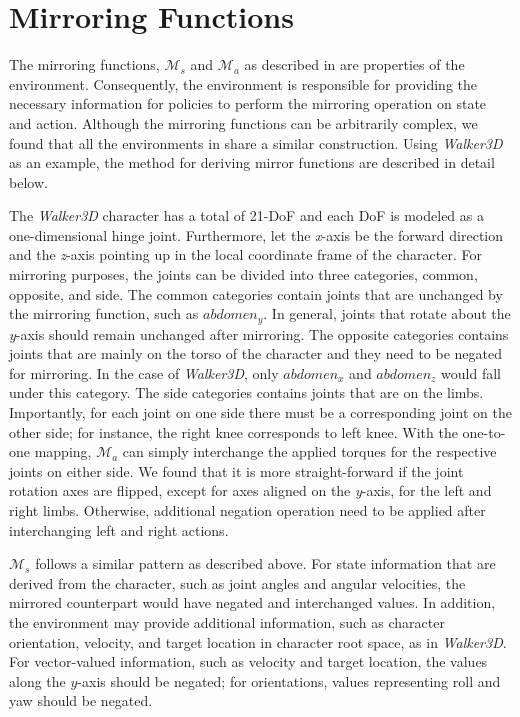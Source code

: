 \section{Mirroring Functions}
\label{sec:mirroring-functions}

The mirroring functions, $\mathcal{M}_s$ and $\mathcal{M}_a$ as described in  are properties of the environment.  Consequently, the environment is responsible for providing the necessary information for policies to perform the mirroring operation on state and action.  Although the mirroring functions can be arbitrarily complex, we found that all the environments in  share a similar construction.  Using \textit{Walker3D} as an example, the method for deriving mirror functions are described in detail below.

The \textit{Walker3D} character has a total of 21-DoF and each DoF is modeled as a one-dimensional hinge joint.  Furthermore, let the \textit{x}-axis be the forward direction and the \textit{z}-axis pointing up in the local coordinate frame of the character.  For mirroring purposes, the joints can be divided into three categories, common, opposite, and side.  The common categories contain joints that are unchanged by the mirroring function, such as $abdomen_y$.  In general, joints that rotate about the \textit{y}-axis should remain unchanged after mirroring.  The opposite categories contains joints that are mainly on the torso of the character and they need to be negated for mirroring.  In the case of \textit{Walker3D}, only $abdomen_x$ and $abdomen_z$ would fall under this category.  The side categories contains joints that are on the limbs.  Importantly, for each joint on one side there must be a corresponding joint on the other side; for instance, the right knee corresponds to left knee.  With the one-to-one mapping, $\mathcal{M}_a$ can simply interchange the applied torques for the respective joints on either side.  We found that it is more straight-forward if the joint rotation axes are flipped, except for axes aligned on the  \textit{y}-axis, for the left and right limbs.  Otherwise, additional negation operation need to be applied after interchanging left and right actions. 

$\mathcal{M}_s$ follows a similar pattern as described above.  For state information that are derived from the character, such as joint angles and angular velocities, the mirrored counterpart would have negated and interchanged values.  In addition, the environment may provide additional information, such as character orientation, velocity, and target location in character root space, as in \textit{Walker3D}.  For vector-valued information, such as velocity and target location, the values along the $y$-axis should be negated; for orientations, values representing roll and yaw should be negated.

